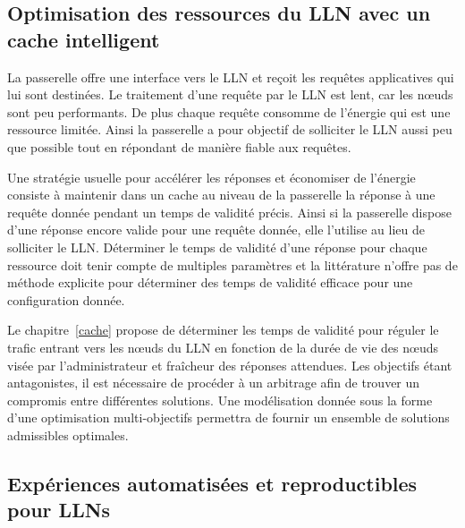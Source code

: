 \subsection{Optimisation des ressources du \ac{LLN} avec un cache intelligent}

La passerelle offre une interface vers le \ac{LLN} et reçoit les requêtes applicatives qui lui sont destinées.
Le traitement d'une requête par le \ac{LLN} est lent, car les nœuds sont peu performants.
De plus chaque requête consomme de l'énergie qui est une ressource limitée.
Ainsi la passerelle a pour objectif de solliciter le \ac{LLN} aussi peu que possible tout en répondant de manière fiable aux requêtes.


Une stratégie usuelle pour accélérer les réponses et économiser de l'énergie consiste à maintenir dans un cache au niveau de la passerelle la réponse à une requête donnée pendant un temps de validité précis.
Ainsi si la passerelle dispose d'une réponse encore valide pour une requête donnée, elle l'utilise au lieu de solliciter le \ac{LLN}.
Déterminer le temps de validité d'une réponse pour chaque ressource doit tenir compte de multiples paramètres et la littérature n'offre pas de méthode explicite pour déterminer des temps de validité efficace pour une configuration donnée.


Le chapitre~\ref{cache} propose de déterminer les temps de validité pour réguler le trafic entrant vers les nœuds du \ac{LLN} en fonction de la durée de vie des nœuds visée par l'administrateur et fraîcheur des réponses attendues.
Les objectifs étant antagonistes, il est nécessaire de procéder à un arbitrage afin de trouver un compromis entre différentes solutions.
Une modélisation donnée sous la forme d'une optimisation multi-objectifs permettra de fournir un ensemble de solutions admissibles optimales.

\subsection{Expériences automatisées et reproductibles pour \ac{LLN}s}

